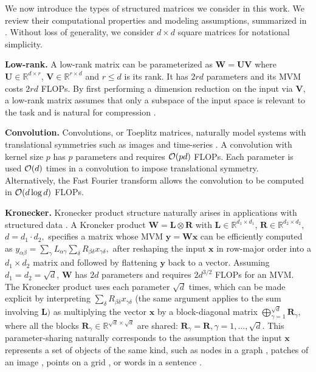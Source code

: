 \documentclass{article}
\newcommand{\mbf}[1]{{\boldsymbol{\mathbf{#1}}}}
\newcommand{\bm}{\mbf}
\theoremstyle{plain}
\theoremstyle{definition}
\theoremstyle{remark}
\newcommand{\R}{\mathbb{R}}
\begin{document}
We now introduce the types of structured matrices we consider in this work. We review their computational properties and modeling assumptions, summarized in . Without loss of generality, we consider $d \times d$ square matrices for notational simplicity.

\noindent \textbf{Low-rank.} \quad
A low-rank matrix can be parameterized as $\bm{W} = \bm{U} \bm{V}$
where $\bm{U} \in \mathbb{R}^{d \times r}$, $\bm{V} \in \mathbb{R}^{r \times d}$ and $r \leq d$ is its rank.
It has $2rd$ parameters and its MVM costs $2rd$ FLOPs. By first performing a dimension reduction on the input via $\bm{V}$, a low-rank matrix assumes that only a subspace of the input space is relevant to the task and is natural for compression \citep{zhao2024galore,wang2020linformer}. 

\noindent \textbf{Convolution.} \quad
Convolutions, or Toeplitz matrices, naturally model systems with translational symmetries such as images \citep{lecun98grad, krizhevsky2021alexnet, he2015resnet} and time-series \citep{wilson2013gaussian}. A convolution with kernel size $p$ has $p$ parameters and requires $\order{p d}$ FLOPs. Each parameter is used $\order{d}$ times in a convolution to impose translational symmetry. Alternatively, the Fast Fourier transform allows the convolution to be computed in $\order{d \log d}$ FLOPs.

\noindent \textbf{Kronecker.} \quad Kronecker product structure naturally arises in applications with structured data \citep{perez2017film, titsias2009variational, maron2020learning, saatcci2012scalable, wilson2015kernel}. A Kroncker product $\bm{W} =\bm{L} \otimes \bm{R}$ with $\bm{L} \in \mathbb{R}^{d_{1} \times d_{1}}$, $\bm{R} \in \mathbb{R}^{d_{2} \times d_{2}}$, $d = d_{1} \cdot d_{2},$ specifies a matrix whose MVM $\bm{y} = \bm{W} \bm{x}$ can be efficiently computed as $y_{\alpha\beta} = \sum_{\gamma} L_{\alpha\gamma} \sum_{\delta} R_{\beta\delta} x_{\gamma\delta},$ after reshaping the input $\bm{x}$ in row-major order into a $d_1 \times d_2$ matrix and followed by flattening $\bm{y}$ back to a vector.
Assuming $d_1 = d_2 = \sqrt{d}$, $\bm{W}$ has $2d$ parameters and requires $2 d^{3/2}$ FLOPs for an MVM. The Kronecker product uses each parameter $\sqrt{d}$ times, which can be made explicit by interpreting $\sum_{\delta} R_{\beta\delta} x_{\gamma\delta}$ (the same argument applies to the sum involving $\bm{L})$ as multiplying the vector $\bm{x}$ by a block-diagonal matrix $\bigoplus_{\gamma=1}^{\sqrt{d}} \bm{R}_\gamma,$ where all the blocks $\bm{R}_\gamma \in \R^{\sqrt{d} \times \sqrt{d}}$ are shared: $\bm{R}_\gamma = \bm{R}, \gamma = 1, \ldots, \sqrt{d}.$ This parameter-sharing naturally corresponds to the assumption that the input $\bm{x}$ represents a set of objects of the same kind, such as nodes in a graph \citep{kipf2016semi}, patches of an image \citep{tolstikhin2021mixer}, points on a grid \citep{saatcci2012scalable}, or words in a sentence \citep{vaswani2017attention,elhage2021mathematical}.
\end{document}

